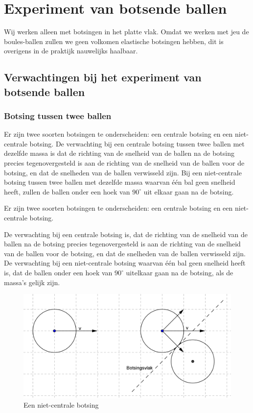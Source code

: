 \documentclass[12pt,a4paper]{article}
\begin{document}
	\newpage

	\section{Experiment van botsende ballen}
	Wij werken alleen met botsingen in het platte vlak. Omdat we werken met jeu de boules-ballen zullen we geen volkomen elastische botsingen hebben, dit is overigens in de praktijk nauwelijks haalbaar.

	\subsection{Verwachtingen bij het experiment van botsende ballen}

	\subsubsection{Botsing tussen twee ballen}
	Er zijn twee soorten botsingen te onderscheiden: een centrale botsing en een niet-centrale botsing. De verwachting bij een centrale botsing tussen twee ballen met dezelfde massa is dat de richting van de snelheid van de ballen na de botsing precies tegenovergesteld is aan de richting van de snelheid van de ballen voor de botsing, en dat de snelheden van de ballen verwisseld zijn.
Bij een niet-centrale botsing tussen twee ballen met dezelfde massa waarvan \'{e}\'{e}n bal geen snelheid heeft, zullen de ballen onder een hoek van $90^{\circ}$ uit elkaar gaan na de botsing. 

	Er zijn twee soorten botsingen te onderscheiden: een centrale botsing en een niet-centrale botsing.

	De verwachting bij een centrale botsing is, dat de richting van de snelheid van de ballen na de botsing precies tegenovergesteld is aan de richting van de snelheid van de ballen voor de botsing, en dat de snelheden van de ballen verwisseld zijn.
	De verwachting bij een niet-centrale botsing waarvan \'{e}\'{e}n bal geen snelheid heeft is, dat de ballen onder een hoek van $90^{\circ}$ uitelkaar gaan na de botsing, als de massa's gelijk zijn. 
	
	\begin{figure}[H]
		\centerline{\includegraphics{Plaatjes/BotsingSchuin-2.png}}
		\caption{Een niet-centrale botsing}
		\label{botsingschuin}
	\end{figure}
	
\end{document}
